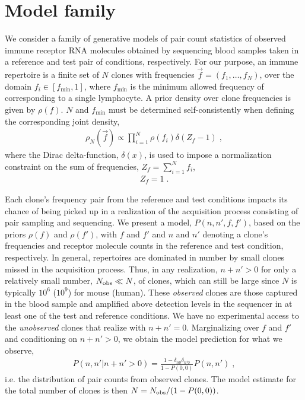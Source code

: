 \documentclass[letterpaper,english,prl,reprint,longbibliography]{revtex4-1}
\begin{document}
\section*{Model family}
We consider a family of generative models of pair count statistics of observed immune receptor RNA molecules obtained by sequencing blood samples taken in a reference and test pair of conditions, respectively. 
For our purpose, an immune repertoire is a finite set of $N$ clones with frequencies $\vec{f}=(f_1,\dots,f_N)$, over the domain $f_i\in[f_{\textrm{min}},1]$, where $f_{\textrm{min}}$ is the minimum allowed frequency of corresponding to a single lymphocyte. A prior density over clone frequencies is given by $\rho(f)$. $N$ and $f_{\textrm{min}}$ must be determined self-consistently when defining the corresponding joint density, 
\begin{eqnarray}
	\rho_N(\vec{f})\propto \prod_{i=1}^N\rho(f_i)\delta(Z_f-1)\;,\label{eq:jointf}
\end{eqnarray}
where the Dirac delta-function, $\delta(x)$, is used to impose a normalization constraint on the sum of frequencies, $Z_f=\sum_{i=1}^N f_i$, 
\begin{align}
  Z_f=1\;. \label{eq:norm_constr}
\end{align}

Each clone's frequency pair from the reference and test conditions impacts its chance of being picked up in a realization of the acquisition process consisting of pair sampling and sequencing. 
We present a model, $P(n,n',f,f')$, based on the priors $\rho(f)$ and $\rho(f')$, with $f$ and $f'$ and $n$ and $n'$ denoting a clone's frequencies and receptor molecule counts in the reference and test condition, respectively. In general, repertoires are dominated in number by small clones missed in the acquisition process. Thus, in any realization, $n+n'>0$ for only a relatively small number, $N_{\textrm{\textrm{obs}}}\ll N$, of clones, which can still be large since $N$ is typically $ 10^6$ ($10^9$) for mouse (human). These \emph{observed} clones are those captured in the blood sample and amplified above detection levels in the sequencer in at least one of the test and reference conditions. We have no experimental access to the \emph{unobserved} clones that realize with $n+n'=0$. Marginalizing over $f$ and $f'$ and conditioning on $n+n'>0$, we obtain the model prediction for what we observe, 
\begin{align}
	P(n,n'|n+n'>0)=\frac{1-\delta_{n0}\delta_{n'0}}{1-P(0,0)}P(n,n')\;,
\end{align} 
i.e. the distribution of pair counts from observed clones. The model estimate for the total number of clones is then $N=N_{\textrm{\textrm{obs}}}/(1-P(0,0))$. 
\end{document}
